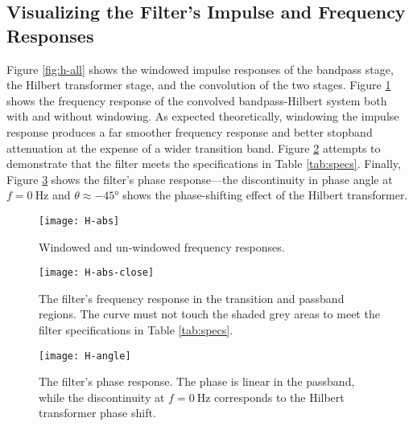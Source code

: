 \subsection{Visualizing the Filter's Impulse and Frequency Responses}
Figure \ref{fig:h-all} shows the windowed impulse responses of the bandpass stage, the Hilbert transformer stage, and the convolution of the two stages. Figure \ref{fig:H-abs} shows the frequency response of the convolved bandpass-Hilbert system both with and without windowing. As expected theoretically, windowing the impulse response produces a far smoother frequency response and better stopband attenuation at the expense of a wider transition band. Figure \ref{fig:H-abs-close} attempts to demonstrate that the filter meets the specifications in Table \ref{tab:specs}. Finally, Figure \ref{fig:H-angle} shows the filter's phase response---the discontinuity in phase angle at $ f = \SI{0}{\hertz} $ and $ \theta \approx - \ang{45} $ shows the phase-shifting effect of the Hilbert transformer.

\newpage


\begin{figure}[htb!]
	\centering
	\texttt{[image: H-abs]}
    \vspace{-3.5ex}
	\caption{Windowed and un-windowed frequency responses.}
	\label{fig:H-abs}
\end{figure}

\begin{figure}[htb!]
	\centering
	\texttt{[image: H-abs-close]}
    \vspace{-2ex}
	\caption{The filter's frequency response in the transition and passband regions. The curve must not touch the shaded grey areas to meet the filter specifications in Table \ref{tab:specs}.}
	\label{fig:H-abs-close}
\end{figure}

\begin{figure}[htb!]
	\centering
	\texttt{[image: H-angle]}
    \vspace{-2ex}
	\caption{The filter's phase response. The phase is linear in the passband, while the discontinuity at $ f = \SI{0}{\hertz} $ corresponds to the Hilbert transformer phase shift.}
	\label{fig:H-angle}
\end{figure}

\clearpage
\restoregeometry

